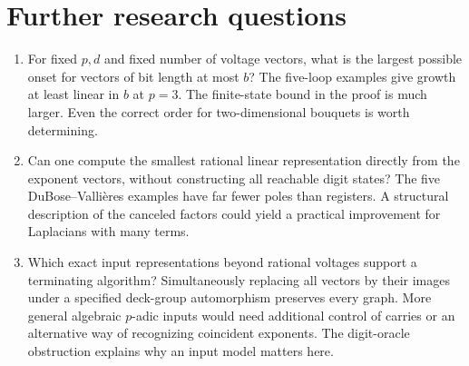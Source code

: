 \documentclass[11pt,letterpaper]{article}
\begin{document}
\section{Further research questions}
\begin{enumerate}
\item For fixed $p,d$ and fixed number of voltage vectors, what is the largest possible onset for vectors of bit length at most $b$? The five-loop examples give growth at least linear in $b$ at $p=3$. The finite-state bound in the proof is much larger. Even the correct order for two-dimensional bouquets is worth determining.
\item Can one compute the smallest rational linear representation directly from the exponent vectors, without constructing all reachable digit states? The five DuBose--Vallières examples have far fewer poles than registers. A structural description of the canceled factors could yield a practical improvement for Laplacians with many terms.
\item Which exact input representations beyond rational voltages support a terminating algorithm? Simultaneously replacing all vectors by their images under a specified deck-group automorphism preserves every graph. More general algebraic $p$-adic inputs would need additional control of carries or an alternative way of recognizing coincident exponents. The digit-oracle obstruction explains why an input model matters here.
\end{enumerate}
\end{document}
